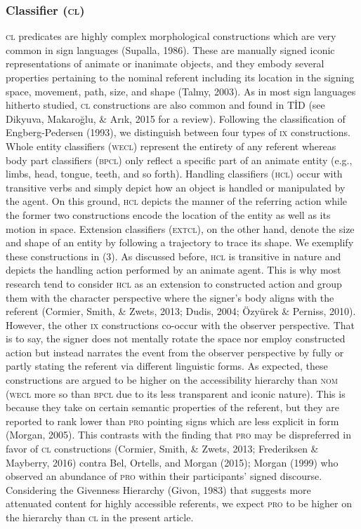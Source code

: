 \documentclass[
  english,
  doc,mask]{apa6}
\begin{document}
\hypertarget{classifier}{%
\subsubsection{\texorpdfstring{Classifier (\textsc{cl})}{Classifier ()}}\label{classifier}}

\textsc{cl} predicates are highly complex morphological constructions which are very common in sign languages (Supalla, 1986). These are manually signed iconic representations of animate or inanimate objects, and they embody several properties pertaining to the nominal referent including its location in the signing space, movement, path, size, and shape (Talmy, 2003). As in most sign languages hitherto studied, \textsc{cl} constructions are also common and found in TİD (see Dikyuva, Makaroğlu, \& Arık, 2015 for a review). Following the classification of Engberg-Pedersen (1993), we distinguish between four types of \textsc{ix} constructions. Whole entity classifiers (\textsc{wecl}) represent the entirety of any referent whereas body part classifiers (\textsc{bpcl}) only reflect a specific part of an animate entity (e.g., limbs, head, tongue, teeth, and so forth). Handling classifiers (\textsc{hcl}) occur with transitive verbs and simply depict how an object is handled or manipulated by the agent. On this ground, \textsc{hcl} depicts the manner of the referring action while the former two constructions encode the location of the entity as well as its motion in space. Extension classifiers (\textsc{extcl}), on the other hand, denote the size and shape of an entity by following a trajectory to trace its shape. We exemplify these constructions in (3). As discussed before, \textsc{hcl} is transitive in nature and depicts the handling action performed by an animate agent. This is why most research tend to consider \textsc{hcl} as an extension to constructed action and group them with the character perspective where the signer's body aligns with the referent (Cormier, Smith, \& Zwets, 2013; Dudis, 2004; Özyürek \& Perniss, 2010). However, the other \textsc{ix} constructions co-occur with the observer perspective. That is to say, the signer does not mentally rotate the space nor employ constructed action but instead narrates the event from the observer perspective by fully or partly stating the referent via different linguistic forms. As expected, these constructions are argued to be higher on the accessibility hierarchy than \textsc{nom} (\textsc{wecl} more so than \textsc{bpcl} due to its less transparent and iconic nature). This is because they take on certain semantic properties of the referent, but they are reported to rank lower than \textsc{pro} pointing signs which are less explicit in form (Morgan, 2005). This contrasts with the finding that \textsc{pro} may be dispreferred in favor of \textsc{cl} constructions (Cormier, Smith, \& Zwets, 2013; Frederiksen \& Mayberry, 2016) contra Bel, Ortells, and Morgan (2015); Morgan (1999) who observed an abundance of \textsc{pro} within their participants' signed discourse. Considering the Givenness Hierarchy (Givon, 1983) that suggests more attenuated content for highly accessible referents, we expect \textsc{pro} to be higher on the hierarchy than \textsc{cl} in the present article. 
\end{document}
